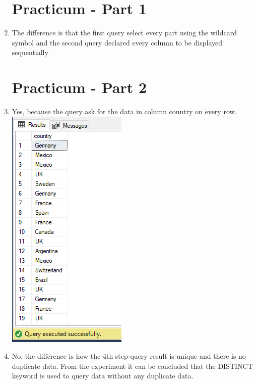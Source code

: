 \documentclass[12pt,titlepage]{article}
\begin{document}
\begin{enumerate}
    \section*{Practicum - Part 1}
    \item The difference is that the first query select every part using the wildcard symbol and the second query declared every column to be displayed sequentially
    \section*{Practicum - Part 2}
    \item Yes, because the query ask for the data in column country on every row. \\
    \includegraphics[height=.76\textheight]{images/figures/fig1.png}
    \newpage
    \item No, the difference is how the 4th step query result is unique and there is no duplicate data. From the experiment it can be concluded that the DISTINCT keyword is used to query data without any duplicate data. \\

\end{enumerate}
\end{document}
